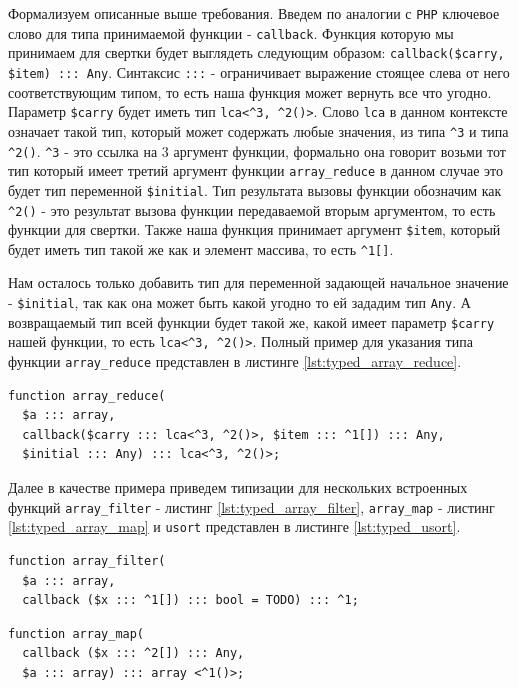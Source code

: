Формализуем описанные выше требования.
Введем по аналогии с \verb|PHP| ключевое слово для типа принимаемой функции - \verb|callback|.
Функция которую мы принимаем для свертки будет выглядеть следующим образом: \verb|callback($carry, $item) ::: Any|.
Синтаксис \verb|:::| - ограничивает выражение стоящее слева от него соответствующим типом, то есть наша функция может вернуть все что угодно.
Параметр \verb|$carry| будет иметь тип \verb|lca<^3, ^2()>|.
Слово \verb|lca| в данном контексте означает такой тип, который может содержать любые значения, из типа \verb|^3| и типа \verb|^2()|.
\verb|^3| - это ссылка на 3 аргумент функции, формально она говорит возьми тот тип который имеет третий аргумент функции \verb|array_reduce| в данном случае это будет тип переменной \verb|$initial|.
Тип результата вызовы функции обозначим как \verb|^2()| - это результат вызова функции передаваемой вторым аргументом, то есть функции для свертки.
Также наша функция принимает аргумент \verb|$item|, который будет иметь тип такой же как и элемент массива, то есть \verb|^1[]|.

Нам осталось только добавить тип для переменной задающей начальное значение - \verb|$initial|, так как она может быть какой угодно то ей зададим тип \verb|Any|.
А возвращаемый тип всей функции будет такой же, какой имеет параметр \verb|$carry| нашей функции, то есть \verb|lca<^3, ^2()>|.
Полный пример для указания типа функции \verb|array_reduce| представлен в листинге \ref{lst:typed_array_reduce}.

\begin{lstlisting}[caption={Пример типизации функции array\_reduce},label={lst:typed_array_reduce}]
function array_reduce(
  $a ::: array,
  callback($carry ::: lca<^3, ^2()>, $item ::: ^1[]) ::: Any,
  $initial ::: Any) ::: lca<^3, ^2()>;
\end{lstlisting}

Далее в качестве примера приведем типизации для нескольких встроенных функций \verb|array_filter| - листинг \ref{lst:typed_array_filter}, \verb|array_map| - листинг \ref{lst:typed_array_map} и \verb|usort| представлен в листинге \ref{lst:typed_usort}.

\begin{lstlisting}[caption={Пример типизации функции array\_filter},label={lst:typed_array_filter}]
function array_filter(
  $a ::: array,
  callback ($x ::: ^1[]) ::: bool = TODO) ::: ^1;
\end{lstlisting}

\begin{lstlisting}[caption={Пример типизации функции array\_map},label={lst:typed_array_map}]
function array_map(
  callback ($x ::: ^2[]) ::: Any,
  $a ::: array) ::: array <^1()>;
\end{lstlisting}

